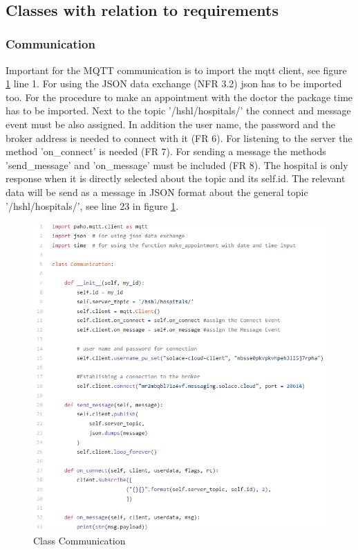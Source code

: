 \\
\subsection{Classes with relation to requirements}
\subsubsection{Communication}
Important for the MQTT communication is to import the mqtt client, see figure \ref{Communication} line 1. For using the JSON data exchange (NFR 3.2) json has to be imported too. For the procedure to make an appointment with the doctor the package time has to be imported. Next to the topic '/hshl/hospitals/' the connect and message event must be also assigned. In addition the user name, the password and the broker address is needed to connect with it (FR 6). For listening to the server the method 'on_connect' is needed (FR 7). For sending a message the methods 'send_message' and 'on_message' must be included (FR 8). The hospital is only response when it is directly selected about the topic and its self.id. The relevant data will be send as a message in JSON format about the general topic '/hshl/hospitals/', see line 23 in figure \ref{Communication}.

\begin{figure}[H]
\centering
\sidecaption
\includegraphics[scale=.53]{images/melanie_images/Communication.png}
\caption{Class Communication}
\label{Communication}
\end{figure}

